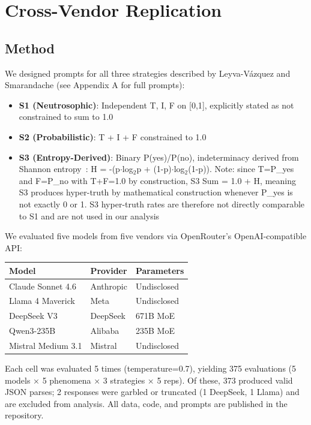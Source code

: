 \section{Cross-Vendor Replication}

\subsection{Method}

We designed prompts for all three strategies described by Leyva-Vázquez
and Smarandache (see Appendix A for full prompts):

\begin{itemize}
\tightlist
\item
  \textbf{S1 (Neutrosophic)}: Independent T, I, F on {[}0,1{]},
  explicitly stated as not constrained to sum to 1.0
\item
  \textbf{S2 (Probabilistic)}: T + I + F constrained to 1.0
\item
  \textbf{S3 (Entropy-Derived)}: Binary P(yes)/P(no), indeterminacy
  derived from Shannon entropy~\cite{shannon1948mathematical}:
  H = -(p$\cdot$log$_{2}$p + (1-p)$\cdot$log$_{2}$(1-p)). Note:
  since T=P\_yes and F=P\_no with T+F=1.0 by construction, S3 Sum = 1.0
  + H, meaning S3 produces hyper-truth by mathematical construction
  whenever P\_yes is not exactly 0 or 1. S3 hyper-truth rates are
  therefore not directly comparable to S1 and are not used in our
  analysis
\end{itemize}

We evaluated five models from five vendors via OpenRouter's
OpenAI-compatible API:

\begin{longtable}[]{@{}lll@{}}
\toprule\noalign{}
Model & Provider & Parameters \\
\midrule\noalign{}
\endhead
\bottomrule\noalign{}
\endlastfoot
Claude Sonnet 4.6 & Anthropic & Undisclosed \\
Llama 4 Maverick & Meta & Undisclosed \\
DeepSeek V3 & DeepSeek & 671B MoE \\
Qwen3-235B & Alibaba & 235B MoE \\
Mistral Medium 3.1 & Mistral & Undisclosed \\
\end{longtable}

Each cell was evaluated 5 times (temperature=0.7), yielding 375
evaluations (5 models × 5 phenomena × 3 strategies × 5 reps). Of these,
373 produced valid JSON parses; 2 responses were garbled or truncated (1
DeepSeek, 1 Llama) and are excluded from analysis. All data, code, and
prompts are published in the repository.

